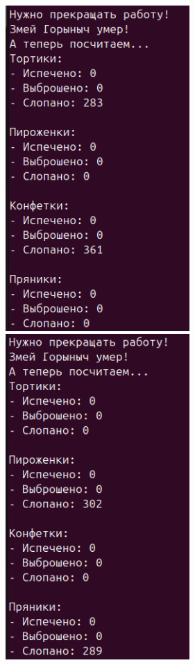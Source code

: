 \documentclass[a4paper,14pt]{extarticle}
\begin{document}
\includegraphics[width=70mm]{processes_output_2_5}
\includegraphics[width=70mm]{processes_output_2_6}
\end{document}
